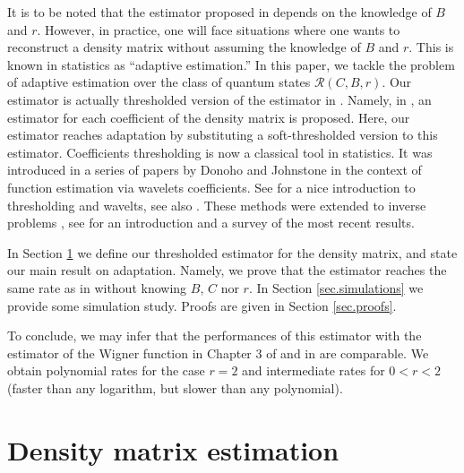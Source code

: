 \documentclass[a4paper]{amsart}
\begin{document}
It is to be noted that the estimator proposed in \cite{ABM} depends on the
knowledge of $B$ and $r$. However, in practice, one will face situations where
one wants to reconstruct a density matrix without assuming the knowledge of
$B$ and $r$. This is known in statistics as ``adaptive estimation.''
In this paper, we tackle the problem of adaptive estimation over the class
of quantum states $\mathcal{R}(C,B,r)$.
Our estimator is actually thresholded version of the estimator in \cite{ABM}.
Namely, in \cite{ABM}, an estimator for each coefficient of the density matrix
is proposed. Here, our estimator reaches adaptation by substituting a soft-thresholded
version
to this estimator. Coefficients thresholding is now a classical tool in
statistics.
It was introduced in a series of papers by Donoho and Johnstone
\cite{DJ94,DJ95,DJKP}
in the context of function estimation via wavelets coefficients. See
\cite{Tsybakov1998} for a nice introduction to thresholding and wavelts, see
also
\cite{cai,Alquier2008a}. These methods were extended to inverse problems
\cite{Dinv,Dinv2,kola,cava1},
see \cite{cava2} for an introduction and a survey of the most recent results.

In Section \ref{sec.dens.mat} we define our thresholded estimator for the
density matrix, and state our main result on adaptation. Namely, we prove that
the estimator reaches the same rate as in \cite{ABM} without knowing $B$, $C$ nor $r$. In
Section \ref{sec.simulations}
we provide some simulation study. Proofs are given in Section \ref{sec.proofs}.

To conclude, we may infer that the performances of this estimator with the
estimator of the Wigner function in Chapter 3 of \cite{Katia} and in \cite{ABM}
are comparable. We obtain polynomial rates for the case $r = 2$ and
intermediate rates for $0 < r < 2$ (faster than any logarithm, but slower than
any polynomial).









\section{Density matrix estimation}
\label{sec.dens.mat}
\end{document}
